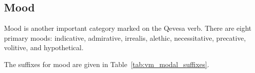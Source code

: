 \documentclass[grammar]{subfiles}
\begin{document}
%
%
%

  \newpage

  \subsection{Mood}
  \label{ssec:vm_mood}

  \ToBeWritten

  Mood is another important category marked on the Qevesa verb. There are eight primary moods: indicative, admirative, irrealis, alethic, necessitative, precative, volitive, and hypothetical.

  The suffixes for mood are given in Table~\ref{tab:vm_modal_suffixes}.
\end{document}
